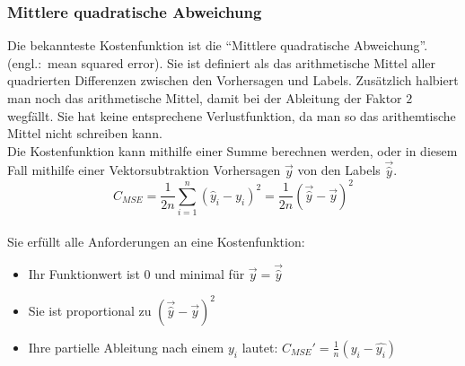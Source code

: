 \subsubsection{Mittlere quadratische Abweichung}
Die bekannteste Kostenfunktion ist die ``Mittlere quadratische Abweichung''.
(engl.:\ mean squared error). Sie ist definiert als das arithmetische Mittel
aller quadrierten Differenzen zwischen den Vorhersagen und Labels.
Zusätzlich halbiert man noch das arithmetische Mittel, damit bei der Ableitung der Faktor
$2$ wegfällt. Sie hat keine entsprechene Verlustfunktion, da man so das
arithemtische Mittel nicht schreiben kann.
\\
Die Kostenfunktion kann mithilfe einer Summe berechnen werden, oder in
diesem Fall mithilfe einer Vektorsubtraktion Vorhersagen $\vec{y}$ von den Labels $\vec{\hat{y}}$.
\\
\begin{equation}\label{eq:MSE}
  C_{MSE} = \frac{1}{2n}\sum_{i=1}^{n}{(\hat{y}_i - y_i)}^2 = \frac{1}{2n}{(\vec{\hat{y}} - \vec{y})}^2
\end{equation}
\\
Sie erfüllt alle Anforderungen an eine Kostenfunktion:
\begin{itemize}
\item{Ihr Funktionwert ist 0 und minimal für $\vec{y} = \vec{\hat{y}}$}
\item{Sie ist proportional zu ${(\vec{\hat{y}}-\vec{y})}^2$}
\item{Ihre partielle Ableitung nach einem $y_i$ lautet: $C_{MSE}'=\frac{1}{n}(y_i-\hat{y_i})$}
\end{itemize}


